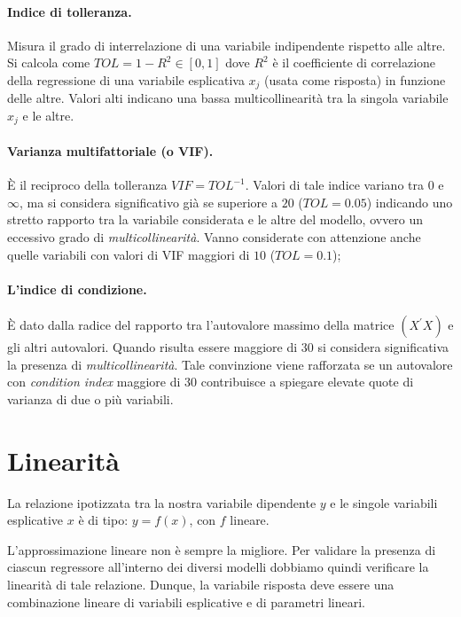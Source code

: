 \documentclass[a4page, 11pt]{article} %
\begin{document}
\paragraph{Indice di tolleranza.} Misura il grado di interrelazione di una variabile indipendente rispetto alle altre.
Si calcola come $TOL = 1 - R^2 \in [0, 1]$ dove $R^2$ è il coefficiente di correlazione della regressione di una variabile esplicativa $x_j$ (usata come risposta) in funzione delle altre.
Valori alti indicano una bassa multicollinearità tra la singola variabile $x_j$ e le altre.

\paragraph{Varianza multifattoriale (o VIF).} È il reciproco della tolleranza $VIF = TOL^{-1}$.
Valori di tale indice variano tra $0$ e $\infty$, ma si considera significativo già se superiore a $20$ ($TOL = 0.05$) indicando uno stretto rapporto tra la variabile considerata e le altre del modello, ovvero un eccessivo grado di \textit{multicollinearità}.
Vanno considerate con attenzione anche quelle variabili con valori di VIF maggiori di $10$ ($TOL = 0.1$);

\paragraph{L'indice di condizione.} È dato dalla radice del rapporto tra l’autovalore massimo della matrice $(X^\prime X)$ e gli altri autovalori.
Quando risulta essere maggiore di $30$ si considera significativa la presenza di \textit{multicollinearità}.
Tale convinzione viene rafforzata se un autovalore con \textit{condition index} maggiore di $30$ contribuisce a spiegare elevate quote di varianza di due o più variabili.

\section{Linearità}
La relazione ipotizzata tra la nostra variabile dipendente $y$ e le singole variabili esplicative $x$ è di tipo: $y = f(x)$, con $f$ lineare.

L'approssimazione lineare non è sempre la migliore.
Per validare la presenza di ciascun regressore all’interno dei diversi modelli dobbiamo quindi verificare la linearità di tale relazione.
Dunque, la variabile risposta deve essere una combinazione lineare di variabili esplicative e di parametri lineari.
\end{document}
